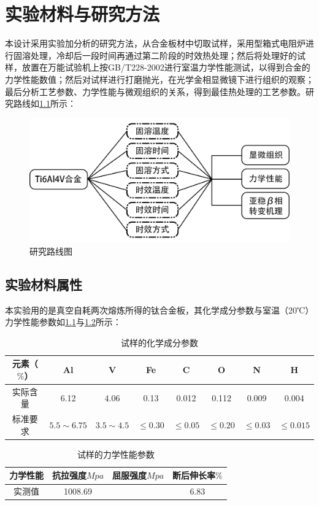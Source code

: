\chapter{实验材料与研究方法}

本设计采用实验加分析的研究方法，从\ti 合金板材中切取试样，采用型箱式电阻炉进行固溶处理，冷却后一段时间再通过第二阶段的时效热处理；然后将处理好的试样，放置在万能试验机上按{GB/T228-2002}进行室温力学性能测试，以得到合金的力学性能数值；然后对试样进行打磨抛光，在光学金相显微镜下进行组织的观察；最后分析工艺参数、力学性能与微观组织的关系，得到最佳热处理的工艺参数。研究路线如\ref{fig:roadmap}所示：

\begin{figure}[h!]
	\centering
	\includegraphics[width=0.8\linewidth]{pic/路线图}
	\caption{研究路线图}
	\label{fig:roadmap}
\end{figure}
\section{实验材料属性}
本实验用的是真空自耗两次熔炼所得的钛合金板，其化学成分参数与室温（20℃）力学性能参数如\ref{sec:mytc4chem}与\ref{sec:mytc4machin}所示：
\begin{table}[htbp]
	\centering
	\caption{试样的化学成分参数}
	\label{sec:mytc4chem}
	\begin{tabular}{cccccccc}
		\toprule
		元素（$ \% $） & Al & V &Fe &C& O& N &H \\ \midrule
		实际含量 & 6.12&4.06 &0.13 &0.012&0.112&0.009&0.004  \\
		标准要求 &$ 5.5\sim 6.75 $ & $ 3.5\sim 4.5 $&$ \le 0.30 $ & $ \le 0.05 $&$ \le 0.20 $&$ \le 0.03$ &$ \le 0.015 $ \\ \bottomrule
	\end{tabular}
\end{table}
\begin{table}[htbp]
	\centering
	\caption{试样的力学性能参数}
	\label{sec:mytc4machin}
	\begin{tabular}{cccc}
		\toprule
		力学性能& 抗拉强度$Mpa  $& 屈服强度$ Mpa $&断后伸长率$ \% $\\ \midrule
		实测值 & 1008.69 & & 6.83\\ \bottomrule
	\end{tabular}
\end{table}

